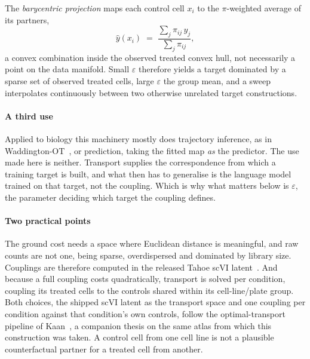 The \emph{barycentric projection} maps each control cell $x_i$ to the
$\pi$-weighted average of its partners,
\begin{equation}
  \hat{y}(x_i) \;=\; \frac{\sum_j \pi_{ij}\, y_j}{\sum_j \pi_{ij}},
\end{equation}
a convex combination inside the observed treated convex hull, not necessarily a
point on the data manifold. Small $\varepsilon$ therefore yields a target
dominated by a sparse set of observed treated cells, large $\varepsilon$ the
group mean, and a sweep interpolates continuously between two otherwise unrelated
target constructions.

\paragraph{A third use} Applied to biology this machinery mostly does
trajectory inference, as in Wad\-ding\-ton-OT~\cite{schiebinger}, or prediction,
taking the fitted map \emph{as} the predictor. The use made here is neither.
Transport supplies the correspondence from which a training target is built, and
what then has to generalise is the language model trained on that target, not the
coupling. Which is why what matters below is $\varepsilon$, the parameter
deciding which target the coupling defines.

\paragraph{Two practical points} The ground cost needs a space where Euclidean
distance is meaningful, and raw counts are not one, being sparse, overdispersed
and dominated by library size. Couplings are therefore computed in the released Tahoe scVI latent~\cite{scvi}. And because a full coupling costs quadratically, transport is solved per condition, coupling its treated cells to the controls shared within its cell-line/plate group. Both choices, the shipped scVI latent as the transport space and one coupling per condition against that condition's own controls, follow the optimal-transport pipeline of Kaan~\cite{mertkaan}, a companion thesis on the same atlas from which this construction was taken. A control cell from one cell line is not
a plausible counterfactual partner for a treated cell from another.
